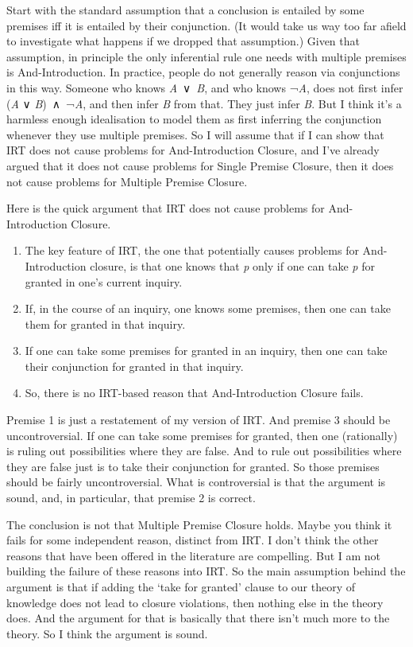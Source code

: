 \documentclass[
  12pt,
  letterpaper,
]{scrbook}
\providecommand{\tightlist}{%
  \setlength{\itemsep}{0pt}\setlength{\parskip}{0pt}}\usepackage{longtable,booktabs,array}
\begin{document}
Start with the standard assumption that a conclusion is entailed by some
premises iff it is entailed by their conjunction. (It would take us way
too far afield to investigate what happens if we dropped that
assumption.) Given that assumption, in principle the only inferential
rule one needs with multiple premises is And-Introduction. In practice,
people do not generally reason via conjunctions in this way. Someone who
knows \emph{A}~∨~\emph{B}, and who knows ¬\emph{A}, does not first infer
(\emph{A} ∨ \emph{B})~∧~¬\emph{A}, and then infer \emph{B} from that.
They just infer \emph{B}. But I think it's a harmless enough
idealisation to model them as first inferring the conjunction whenever
they use multiple premises. So I will assume that if I can show that IRT
does not cause problems for And-Introduction Closure, and I've already
argued that it does not cause problems for Single Premise Closure, then
it does not cause problems for Multiple Premise Closure.

Here is the quick argument that IRT does not cause problems for
And-Introduction Closure.

\begin{enumerate}
\def\labelenumi{\arabic{enumi}.}
\tightlist
\item
  The key feature of IRT, the one that potentially causes problems for
  And-Introduction closure, is that one knows that \emph{p} only if one
  can take \emph{p} for granted in one's current inquiry.
\item
  If, in the course of an inquiry, one knows some premises, then one can
  take them for granted in that inquiry.
\item
  If one can take some premises for granted in an inquiry, then one can
  take their conjunction for granted in that inquiry.
\item
  So, there is no IRT-based reason that And-Introduction Closure fails.
\end{enumerate}

Premise 1 is just a restatement of my version of IRT. And premise 3
should be uncontroversial. If one can take some premises for granted,
then one (rationally) is ruling out possibilities where they are false.
And to rule out possibilities where they are false just is to take their
conjunction for granted. So those premises should be fairly
uncontroversial. What is controversial is that the argument is sound,
and, in particular, that premise 2 is correct.

The conclusion is not that Multiple Premise Closure holds. Maybe you
think it fails for some independent reason, distinct from IRT. I don't
think the other reasons that have been offered in the literature are
compelling. But I am not building the failure of these reasons into IRT.
So the main assumption behind the argument is that if adding the `take
for granted' clause to our theory of knowledge does not lead to closure
violations, then nothing else in the theory does. And the argument for
that is basically that there isn't much more to the theory. So I think
the argument is sound.
\end{document}
